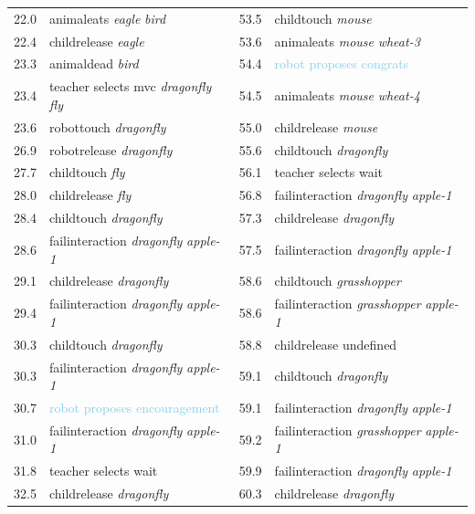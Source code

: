 {\begin{table}[ht]
\begin{tabularx}{\textwidth}{@{}L{.2}L{1.7}|L{.2}L{1.9}@{}}
22.0 & animaleats \emph{eagle} \emph{bird} & 53.5 & childtouch \emph{mouse}\\
22.4 & childrelease \emph{eagle} & 53.6 & animaleats \emph{mouse} \emph{wheat-3}\\
23.3 & animaldead \emph{bird} & 54.4 & \textcolor{SkyBlue}{robot proposes congrats}\\
23.4 & \textcolor{BurntOrange}{teacher selects mvc \emph{dragonfly} \emph{fly}} & 54.5 & animaleats \emph{mouse} \emph{wheat-4}\\
23.6 & robottouch \emph{dragonfly} & 55.0 & childrelease \emph{mouse}\\
26.9 & robotrelease \emph{dragonfly} & 55.6 & childtouch \emph{dragonfly}\\
27.7 & childtouch \emph{fly} & 56.1 & \textcolor{BurntOrange}{teacher selects wait}\\
28.0 & childrelease \emph{fly} & 56.8 & failinteraction \emph{dragonfly} \emph{apple-1}\\
28.4 & childtouch \emph{dragonfly} & 57.3 & childrelease \emph{dragonfly}\\
28.6 & failinteraction \emph{dragonfly} \emph{apple-1} & 57.5 & failinteraction \emph{dragonfly} \emph{apple-1}\\
29.1 & childrelease \emph{dragonfly} & 58.6 & childtouch \emph{grasshopper}\\
29.4 & failinteraction \emph{dragonfly} \emph{apple-1} & 58.6 & failinteraction \emph{grasshopper} \emph{apple-1}\\
30.3 & childtouch \emph{dragonfly} & 58.8 & childrelease undefined\\
30.3 & failinteraction \emph{dragonfly} \emph{apple-1} & 59.1 & childtouch \emph{dragonfly}\\
30.7 & \textcolor{SkyBlue}{robot proposes encouragement} & 59.1 & failinteraction \emph{dragonfly} \emph{apple-1}\\
31.0 & failinteraction \emph{dragonfly} \emph{apple-1} & 59.2 & failinteraction \emph{grasshopper} \emph{apple-1}\\
31.8 & \textcolor{BurntOrange}{teacher selects wait} & 59.9 & failinteraction \emph{dragonfly} \emph{apple-1}\\
32.5 & childrelease \emph{dragonfly} & 60.3 & childrelease \emph{dragonfly}\\
			\bottomrule
		\end{tabularx}
	\end{table}
	\clearpage%
}

